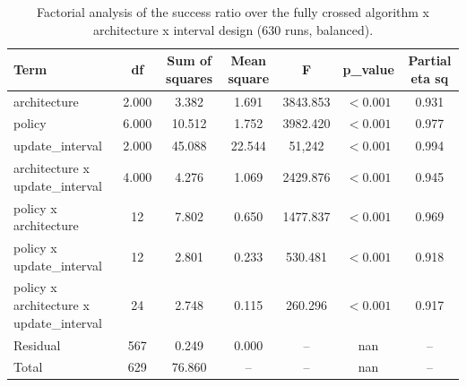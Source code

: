\begin{table}
\centering
\footnotesize
\caption{Factorial analysis of the success ratio over the fully crossed algorithm x architecture x interval design (630 runs, balanced).}
\label{tab:p1-factor-effects}
\begin{tabular}{lcccccc}
\toprule
Term & df & Sum of squares & Mean square & F & p\_value & Partial eta sq \\
\midrule
architecture & 2.000 & 3.382 & 1.691 & 3843.853 & $<0.001$ & 0.931 \\
policy & 6.000 & 10.512 & 1.752 & 3982.420 & $<0.001$ & 0.977 \\
update\_interval & 2.000 & 45.088 & 22.544 & 51,242 & $<0.001$ & 0.994 \\
architecture x update\_interval & 4.000 & 4.276 & 1.069 & 2429.876 & $<0.001$ & 0.945 \\
policy x architecture & 12 & 7.802 & 0.650 & 1477.837 & $<0.001$ & 0.969 \\
policy x update\_interval & 12 & 2.801 & 0.233 & 530.481 & $<0.001$ & 0.918 \\
policy x architecture x update\_interval & 24 & 2.748 & 0.115 & 260.296 & $<0.001$ & 0.917 \\
Residual & 567 & 0.249 & 0.000 & -- & nan & -- \\
Total & 629 & 76.860 & -- & -- & nan & -- \\
\bottomrule
\end{tabular}
\par\vspace{2pt}{\footnotesize\raggedright The design is perfectly balanced, so each term's sum of squares is the unique ANOVA sum of squares and does not depend on the order of entry. The significant three-way interaction is the formal statement that algorithm comparisons are not configuration-free.\par}
\end{table}
